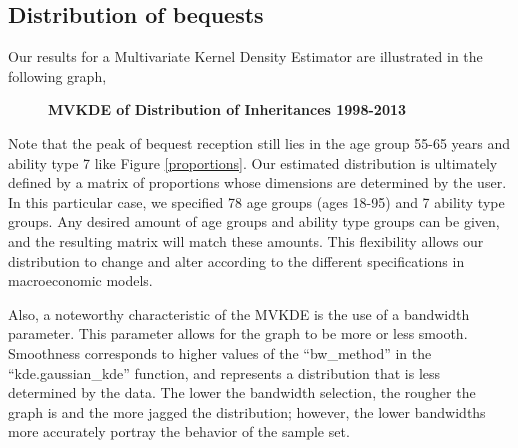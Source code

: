 \documentclass[letterpaper,12pt]{article}
\newcommand{\quotes}[1]{``#1''}
\theoremstyle{definition}
\begin{document}
\begin{spacing}{1.5}
  \subsection{Distribution of bequests}\label{SecDistEst}

    Our results for a Multivariate Kernel Density Estimator are illustrated in the following graph,\\

    \begin{figure}[htbp]\centering \captionsetup{width=6.0in}
      \caption{\label{MVKDE}\textbf{MVKDE of Distribution of Inheritances 1998-2013}}
    \end{figure}

    Note that the peak of bequest reception still lies in the age group 55-65 years and ability type 7 like Figure \ref{proportions}. Our estimated distribution is ultimately defined by a matrix of proportions whose dimensions are determined by the user. In this particular case, we specified 78 age groups (ages 18-95) and 7 ability type groups. Any desired amount of age groups and ability type groups can be given, and the resulting matrix will match these amounts. This flexibility allows our distribution to change and alter according to the different specifications in macroeconomic models.

    Also, a noteworthy characteristic of the MVKDE is the use of a bandwidth parameter. This parameter allows for the graph to be more or less smooth. Smoothness corresponds to higher values of the \quotes{bw\_method} in the \quotes{kde.gaussian\_kde} function, and represents a distribution that is less determined by the data. The lower the bandwidth selection, the rougher the graph is and the more jagged the distribution; however, the lower bandwidths more accurately portray the behavior of the sample set.



\end{spacing}
\end{document}

